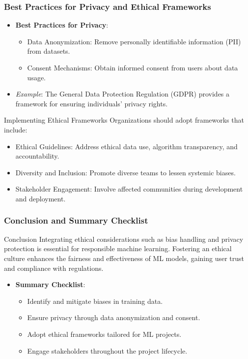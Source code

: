 \documentclass[aspectratio=169]{beamer}
\begin{document}
\begin{frame}[fragile]
    \frametitle{Best Practices for Privacy and Ethical Frameworks}
    \begin{itemize}
        \item \textbf{Best Practices for Privacy}:
        \begin{itemize}
            \item Data Anonymization: Remove personally identifiable information (PII) from datasets.
            \item Consent Mechanisms: Obtain informed consent from users about data usage.
        \end{itemize}
        \item \textit{Example}: The General Data Protection Regulation (GDPR) provides a framework for ensuring individuals' privacy rights.
    \end{itemize}
    
    \begin{block}{Implementing Ethical Frameworks}
        Organizations should adopt frameworks that include:
        \begin{itemize}
            \item Ethical Guidelines: Address ethical data use, algorithm transparency, and accountability.
            \item Diversity and Inclusion: Promote diverse teams to lessen systemic biases.
            \item Stakeholder Engagement: Involve affected communities during development and deployment.
        \end{itemize}
    \end{block}
\end{frame}

\begin{frame}[fragile]
    \frametitle{Conclusion and Summary Checklist}
    \begin{block}{Conclusion}
        Integrating ethical considerations such as bias handling and privacy protection is essential for responsible machine learning. Fostering an ethical culture enhances the fairness and effectiveness of ML models, gaining user trust and compliance with regulations.
    \end{block}

    \begin{itemize}
        \item \textbf{Summary Checklist}:
        \begin{itemize}
            \item [\checkmark] Identify and mitigate biases in training data.
            \item [\checkmark] Ensure privacy through data anonymization and consent.
            \item [\checkmark] Adopt ethical frameworks tailored for ML projects.
            \item [\checkmark] Engage stakeholders throughout the project lifecycle.
        \end{itemize}
    \end{itemize}
\end{frame}
\end{document}
